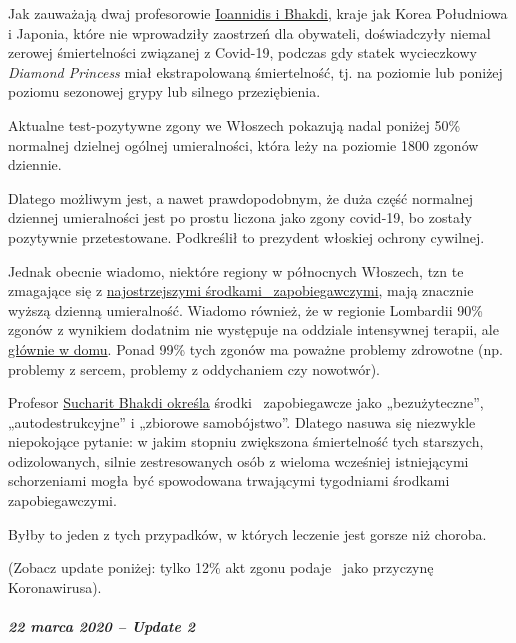 Jak zauważają dwaj profesorowie
\href{https://www.statnews.com/2020/03/17/a-fiasco-in-the-making-as-the-coronavirus-pandemic-takes-hold-we-are-making-decisions-without-reliable-data/}{Ioannidis
i Bhakdi}, kraje jak Korea Południowa i Japonia, które nie wprowadziły
zaostrzeń dla obywateli, doświadczyły niemal zerowej śmiertelności
związanej z Covid-19, podczas gdy statek wycieczkowy \emph{Diamond
Princess} miał ekstrapolowaną śmiertelność, tj. na poziomie lub poniżej
poziomu sezonowej grypy lub silnego przeziębienia.

Aktualne test-pozytywne zgony we Włoszech pokazują nadal poniżej 50\%
normalnej dzielnej ogólnej umieralności, która leży na poziomie 1800
zgonów dziennie.

Dlatego możliwym jest, a nawet prawdopodobnym, że duża część normalnej
dziennej umieralności jest po prostu liczona jako zgony covid-19, bo
zostały pozytywnie przetestowane. Podkreślił to prezydent włoskiej
ochrony cywilnej.

Jednak obecnie wiadomo, niektóre regiony w północnych Włoszech, tzn te
zmagające się z
\href{https://en.wikipedia.org/wiki/2020_Italy_coronavirus_lockdown}{najostrzejszymi
środkami~ zapobiegawczymi}, mają znacznie wyższą dzienną umieralność.
Wiadomo również, że w regionie Lombardii 90\% zgonów z wynikiem dodatnim
nie występuje na oddziale intensywnej terapii, ale
\href{https://www.tgcom24.mediaset.it/cronaca/coronavirus-in-lombardia-9-morti-su-10-mai-giunti-in-terapia-intensiva_16362350-202002a.shtml}{głównie
w domu}. Ponad 99\% tych zgonów ma poważne problemy zdrowotne (np.
problemy z sercem, problemy z oddychaniem czy nowotwór).

Profesor \href{https://www.youtube.com/watch?v=JBB9bA-gXL4}{Sucharit
Bhakdi określa} środki~ zapobiegawcze jako „bezużyteczne'',
„autodestrukcyjne'' i „zbiorowe samobójstwo''. Dlatego nasuwa się
niezwykle niepokojące pytanie: w jakim stopniu zwiększona śmiertelność
tych starszych, odizolowanych, silnie zestresowanych osób z wieloma
wcześniej istniejącymi schorzeniami mogła być spowodowana trwającymi
tygodniami środkami zapobiegawczymi.

Byłby to jeden z tych przypadków, w których leczenie jest gorsze niż
choroba.

(Zobacz update poniżej: tylko 12\% akt zgonu podaje~ jako przyczynę
Koronawirusa).

\hypertarget{22-marca-2020--update-2}{%
\subparagraph{\texorpdfstring{\textbf{22 marca 2020 -- Update
2}}{22 marca 2020 -- Update 2}}\label{22-marca-2020--update-2}}

